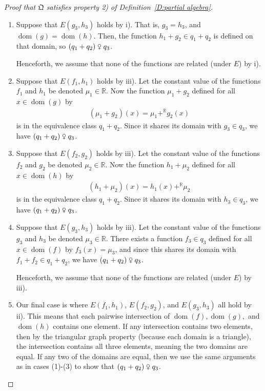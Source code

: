 \documentclass{scrartcl}
\DeclareMathOperator{\dom}{dom}
\newcommand{\BR}{\mathbb{R}}
\newcommand{\com}{\mathrel{\venus}}
\begin{document}
\begin{proof}[Proof that $\mathfrak{Q}$ satisfies property 2) of Definition~\ref{D:partial algebra}]
\begin{enumerate}
\item Suppose that $E(g_3,h_3)$ holds by i). That is, $g_3=h_3$, and $\dom(g)=\dom(h)$. Then, the function $h_1+g_2\in q_1+q_2$ is defined on that domain, so $(q_1+q_2)\com q_3$.

Henceforth, we assume that none of the functions are related (under $E$) by i).

\item Suppose that $E(f_1,h_1)$ holds by iii). Let the constant value of the functions $f_1$ and $h_1$ be denoted $\mu_1\in\BR$. Now the function $\mu_1+g_2$ defined for all $x\in\dom(g)$ by
\begin{align*}
(\mu_1+g_2)(x)=\mu_1+^{\BR}g_2(x)
\end{align*}
is in the equivalence class $q_1+q_2$. Since it shares its domain with $g_3\in q_3$, we have $(q_1+q_2)\com q_3$.

\item Suppose that $E(f_2,g_2)$ holds by iii). Let the constant value of the functions $f_2$ and $g_2$ be denoted $\mu_2\in\BR$. Now the function $h_1+\mu_2$ defined for all $x\in\dom(h)$ by
\begin{align*}
(h_1+\mu_2)(x)=h_1(x)+^{\BR}\mu_2
\end{align*}
is in the equivalence class $q_1+q_2$. Since it shares its domain with $h_3\in q_3$, we have $(q_1+q_2)\com q_3$.

\item Suppose that $E(g_3,h_3)$ holds by iii). Let the constant value of the functions $g_3$ and $h_3$ be denoted $\mu_3\in\BR$. There exists a function $f_3\in q_3$ defined for all $x\in\dom(f)$ by $f_3(x)=\mu_3$, and since this shares its domain with $f_1+f_2\in q_1+q_2$, we have $(q_1+q_2)\com q_3$.

Henceforth, we assume that none of the functions are related (under $E$) by iii).

\item Our final case is where $E(f_1,h_1)$, $E(f_2,g_2)$, and $E(g_3,h_3)$ all hold by ii). This means that each pairwise intersection of $\dom(f),\dom(g),$ and $\dom(h)$ contains one element. If any intersection contains two elements, then by the triangular graph property (because each domain is a triangle), the intersection contains all three elements, meaning the two domains are equal. If any two of the domains are equal, then we use the same arguments as in cases (1)-(3) to show that $(q_1+q_2)\com q_3$.


\end{enumerate}
\end{proof}
\end{document}

